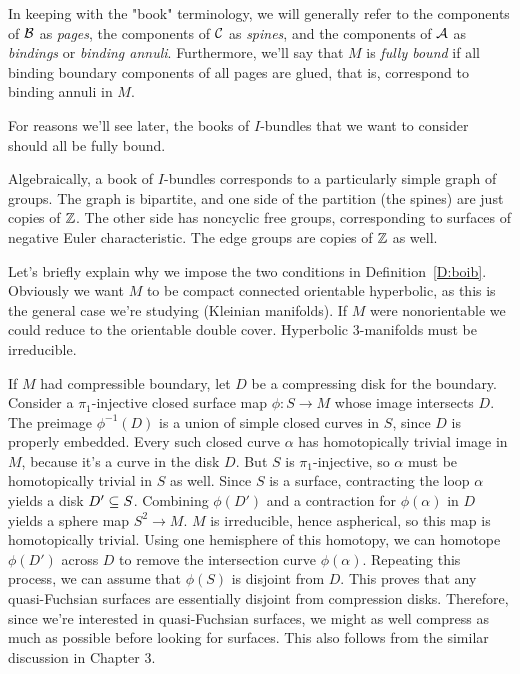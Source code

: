 \begin{defn}

In keeping with the "book" terminology, we will generally refer to the
components of $\mathcal{B}$ as \emph{pages}, the components of $\mathcal{C}$ as \emph{spines},
and the components of $\mathcal{A}$ as \emph{bindings} or \emph{binding annuli}.
Furthermore, we'll say that $M$ is \emph{fully bound} if all binding boundary
components of all pages are glued, that is, correspond to binding annuli in
$M$.

\end{defn}

For reasons we'll see later, the books of $I$-bundles that we want to consider
should all be fully bound.

Algebraically, a book of $I$-bundles corresponds to a particularly simple graph
of groups. The graph is bipartite, and one side of the partition (the spines)
are just copies of $\mathbb{Z}$. The other side has noncyclic free groups,
corresponding to surfaces of negative Euler characteristic. The edge groups are
copies of $\mathbb{Z}$ as well.

Let's briefly explain why we impose the two conditions in
Definition~\ref{D:boib}.  Obviously we want $M$ to be compact connected
orientable hyperbolic, as this is the general case we're studying (Kleinian
manifolds). If $M$ were nonorientable we could reduce to the orientable double
cover. Hyperbolic 3-manifolds must be irreducible.

If $M$ had compressible boundary, let $D$ be a compressing disk for the
boundary.  Consider a $\pi_1$-injective closed surface map $\phi \colon S \to
M$ whose image intersects $D$. The preimage $\phi^{-1}(D)$ is a union of simple
closed curves in $S$, since $D$ is properly embedded.  Every such closed curve
$\alpha$ has homotopically trivial image in $M$, because it's a curve in the
disk $D$.  But $S$ is $\pi_1$-injective, so $\alpha$ must be homotopically
trivial in $S$ as well.  Since $S$ is a surface, contracting the loop $\alpha$
yields a disk $D'\subseteq S$. Combining $\phi(D')$ and a contraction for
$\phi(\alpha)$ in $D$ yields a sphere map $S^2 \to M$. $M$ is irreducible,
hence aspherical, so this map is homotopically trivial. Using one hemisphere of
this homotopy, we can homotope $\phi(D')$ across $D$ to remove the intersection
curve $\phi(\alpha)$. Repeating this process, we can assume that $\phi(S)$ is
disjoint from $D$. This proves that any quasi-Fuchsian surfaces are essentially
disjoint from compression disks.  Therefore, since we're interested in
quasi-Fuchsian surfaces, we might as well compress as much as possible before
looking for surfaces. This also follows from the similar discussion in Chapter
3.

